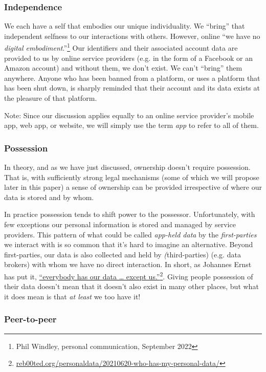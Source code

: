 \documentclass[11pt, oneside]{article}   	%
\newcommand{\hyperfootnote}[1][]{\def\ArgI{{#1}}\hyperfootnoteRelay}
\newcommand\hyperfootnoteRelay[2][]{\href{#1#2}{\ArgI}\footnote{\href{#1#2}{#2}}}
\begin{document}
\subsubsection{Independence} 

We each have a self that embodies our unique individuality. We ``bring'' that independent selfness to our interactions with others. However, online ``we have no \emph{digital embodiment}.''\footnote{Phil Windley, personal communication, September 2022} Our identifiers and their associated account data are provided to us by online service providers (e.g. in the form of a Facebook or an Amazon account) and without them, we don't exist. We can't ``bring'' them anywhere. Anyone who has been banned from a platform, or uses a platform that has been shut down, is sharply reminded that their account and its data exists at the pleasure of that platform. 

Note: Since our discussion applies equally to an online service provider's mobile app, web app, or website, we will simply use the term \emph{app} to refer to all of them.

\subsubsection{Possession} 

In theory, and as we have just discussed, ownership doesn't require possession. That is, with sufficiently strong legal mechanisms (some of which we will propose later in this paper) a sense of ownership can be provided irrespective of where our data is stored and by whom. 

In practice possession tends to shift power to the possessor. Unfortunately, with few exceptions our personal information is stored and managed by service providers. This pattern of what could be called \emph{app-held data} by the \emph{first-parties} we interact with is so common that it's hard to imagine an alternative. Beyond first-parties, our data is also collected and held by \emph(third-parties) (e.g. data brokers) with whom we have no direct interaction. In short, as Johannes Ernst has put it, \hyperfootnote[“everybody has our data … except us.”][https://]{reb00ted.org/personaldata/20210620-who-has-my-personal-data/}. Giving people possession of their data doesn't mean that it doesn't also exist in many other places, but what it does mean is that \emph{at least} we too have it!

\subsubsection{Peer-to-peer}
\end{document}
